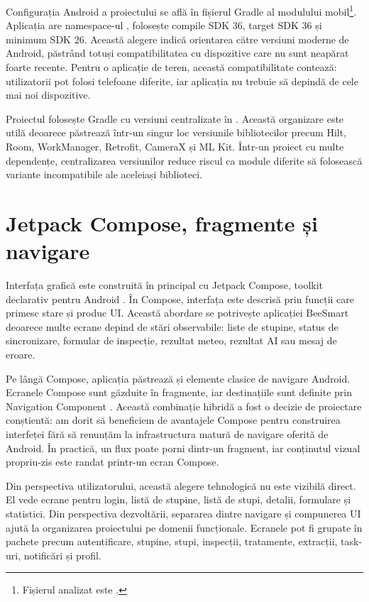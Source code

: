 Configurația Android a proiectului se află în fișierul Gradle al modulului mobil\footnote{Fișierul analizat este .}. Aplicația are namespace-ul , folosește compile SDK 36, target SDK 36 și minimum SDK 26. Această alegere indică orientarea către versiuni moderne de Android, păstrând totuși compatibilitatea cu dispozitive care nu sunt neapărat foarte recente. Pentru o aplicație de teren, această compatibilitate contează: utilizatorii pot folosi telefoane diferite, iar aplicația nu trebuie să depindă de cele mai noi dispozitive.

Proiectul folosește Gradle cu versiuni centralizate în . Această organizare este utilă deoarece păstrează într-un singur loc versiunile bibliotecilor precum Hilt, Room, WorkManager, Retrofit, CameraX și ML Kit. Într-un proiect cu multe dependențe, centralizarea versiunilor reduce riscul ca module diferite să folosească variante incompatibile ale aceleiași biblioteci.

\section{Jetpack Compose, fragmente și navigare}

Interfața grafică este construită în principal cu Jetpack Compose, toolkit declarativ pentru Android \cite{androidComposeDocs}. În Compose, interfața este descrisă prin funcții care primesc stare și produc UI. Această abordare se potrivește aplicației BeeSmart deoarece multe ecrane depind de stări observabile: liste de stupine, status de sincronizare, formular de inspecție, rezultat meteo, rezultat AI sau mesaj de eroare.

Pe lângă Compose, aplicația păstrează și elemente clasice de navigare Android. Ecranele Compose sunt găzduite în fragmente, iar destinațiile sunt definite prin Navigation Component \cite{androidNavigationDocs}. Această combinație hibridă a fost o decizie de proiectare conștientă: am dorit să beneficiem de avantajele Compose pentru construirea interfeței fără să renunțăm la infrastructura matură de navigare oferită de Android. În practică, un flux poate porni dintr-un fragment, iar conținutul vizual propriu-zis este randat printr-un ecran Compose.

Din perspectiva utilizatorului, această alegere tehnologică nu este vizibilă direct. El vede ecrane pentru login, listă de stupine, listă de stupi, detalii, formulare și statistici. Din perspectiva dezvoltării, separarea dintre navigare și compunerea UI ajută la organizarea proiectului pe domenii funcționale. Ecranele pot fi grupate în pachete precum autentificare, stupine, stupi, inspecții, tratamente, extracții, task-uri, notificări și profil.

